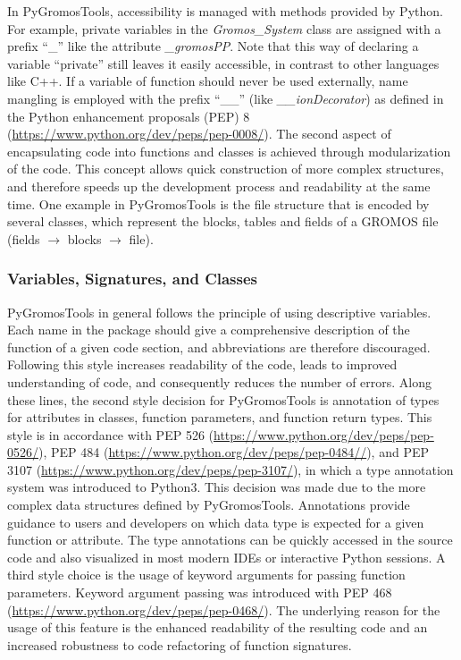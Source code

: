In PyGromosTools, accessibility is managed with methods provided by Python. For example, private variables in the \textit{Gromos\_System} class are assigned with a prefix ``\_'' like the attribute \textit{\_gromosPP}. Note that this way of declaring a variable ``private'' still leaves it easily accessible, in contrast to other languages like C++. If a variable of function should never be used externally, name mangling is employed with the prefix ``\_\_'' (like \textit{\_\_ionDecorator}) as defined in the Python enhancement proposals (PEP) 8 (\url{https://www.python.org/dev/peps/pep-0008/}).
The second aspect of encapsulating code into functions and classes is achieved through modularization of the code. This concept allows quick construction of more complex structures, and therefore speeds up the development process and readability at the same time.\cite{Ganney2020}
One example in PyGromosTools is the file structure that is encoded by several classes, which represent the blocks, tables and fields of a GROMOS file (fields $\rightarrow$ blocks $\rightarrow$ file).

\subsubsection{Variables, Signatures, and Classes}
PyGromosTools in general follows the principle of using descriptive variables. Each name in the package should give a comprehensive description of the function of a given code section, and abbreviations are therefore discouraged. Following this style increases readability of the code, leads to improved understanding of code, and consequently reduces the number of errors. Along these lines, the second style decision for PyGromosTools is annotation of types for attributes in classes, function parameters, and function return types. This style is in accordance with PEP 526 (\url{https://www.python.org/dev/peps/pep-0526/}), PEP 484 (\url{https://www.python.org/dev/peps/pep-0484//}), and PEP 3107 (\url{https://www.python.org/dev/peps/pep-3107/}), in which a type annotation system was introduced to Python3. This decision was made due to the more complex data structures defined by PyGromosTools. Annotations provide guidance to users and developers on which data type is expected for a given function or attribute. The type annotations can be quickly accessed in the source code and also visualized in most modern IDEs or interactive Python sessions. A third style choice is the usage of keyword arguments for passing function parameters. Keyword argument passing was introduced with PEP 468 (\url{https://www.python.org/dev/peps/pep-0468/}). The underlying reason for the usage of this feature is the enhanced readability of the resulting code and an increased robustness to code refactoring of function signatures.


